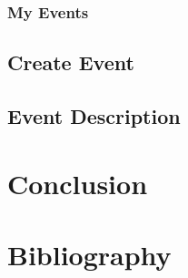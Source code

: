 \documentclass[a4paper,11pt, oneside]{book}
\begin{document}
		\subsection{My Events}

		\section{Create Event}

		\section{Event Description}


	\chapter{Conclusion}

	\chapter{Bibliography}
\end{document}
